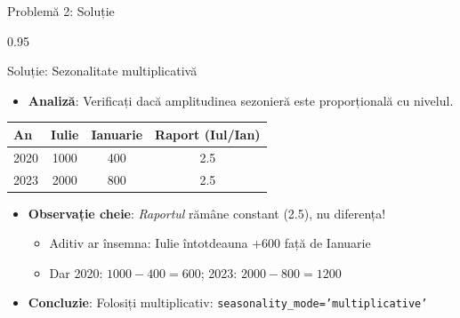 \documentclass[9pt, aspectratio=169, t]{beamer}
\begin{document}
\begin{frame}{Problemă 2: Soluție}
    \begin{cminipage}{0.95\textwidth}
    \begin{exampleblock}{Soluție: Sezonalitate multiplicativă}
        \begin{itemize}\setlength{\itemsep}{0pt}
            \item \textbf{Analiză}: Verificați dacă amplitudinea sezonieră este proporțională cu nivelul.
        \end{itemize}

        \vspace{0.2cm}
        \begin{tabular}{lccc}
            \toprule
            An & Iulie & Ianuarie & Raport (Iul/Ian) \\
            \midrule
            2020 & 1000 & 400 & 2.5 \\
            2023 & 2000 & 800 & 2.5 \\
            \bottomrule
        \end{tabular}

        \vspace{0.3cm}
        \begin{itemize}\setlength{\itemsep}{0pt}
            \item \textbf{Observație cheie}: \textit{Raportul} rămâne constant (2.5), nu diferența!
            \begin{itemize}\setlength{\itemsep}{0pt}
                \item Aditiv ar însemna: Iulie întotdeauna +600 față de Ianuarie
                \item Dar 2020: $1000 - 400 = 600$; 2023: $2000 - 800 = 1200$
            \end{itemize}
            \item \textbf{Concluzie}: Folosiți multiplicativ: \texttt{seasonality\_mode='multiplicative'}
        \end{itemize}
    \end{exampleblock}
    \end{cminipage}
\end{frame}
\end{document}
